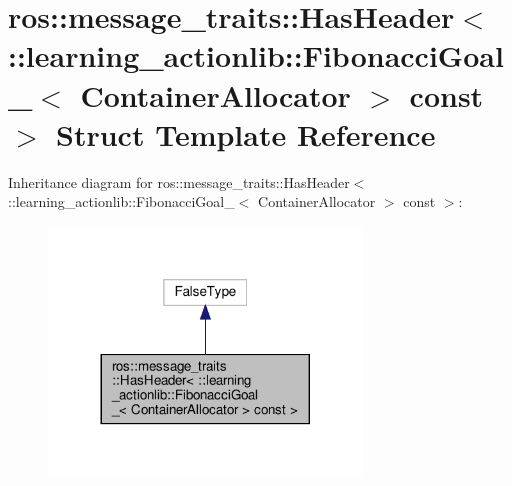 \hypertarget{structros_1_1message__traits_1_1HasHeader_3_01_1_1learning__actionlib_1_1FibonacciGoal___3_01Con78850b29e7a4650a81989a1eaae2c3f9}{}\section{ros\+:\+:message\+\_\+traits\+:\+:Has\+Header$<$ \+:\+:learning\+\_\+actionlib\+:\+:Fibonacci\+Goal\+\_\+$<$ Container\+Allocator $>$ const $>$ Struct Template Reference}
\label{structros_1_1message__traits_1_1HasHeader_3_01_1_1learning__actionlib_1_1FibonacciGoal___3_01Con78850b29e7a4650a81989a1eaae2c3f9}


Inheritance diagram for ros\+:\+:message\+\_\+traits\+:\+:Has\+Header$<$ \+:\+:learning\+\_\+actionlib\+:\+:Fibonacci\+Goal\+\_\+$<$ Container\+Allocator $>$ const $>$\+:
\nopagebreak
\begin{figure}[H]
\begin{center}
\leavevmode
\includegraphics[width=236pt]{structros_1_1message__traits_1_1HasHeader_3_01_1_1learning__actionlib_1_1FibonacciGoal___3_01Conaaec0a888a390c0151b5fd987bf14bd0}
\end{center}
\end{figure}


